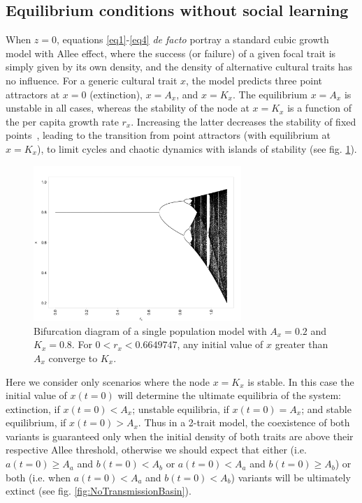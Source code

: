 \documentclass[preprint,authoryear]{elsarticle}
\begin{document}
\subsection{Equilibrium conditions without social learning}

When $z=0$, equations \ref{eq1}-\ref{eq4} \emph{de facto} portray a standard cubic growth model with Allee effect, where the success (or failure) of a given focal trait is simply given by its own density, and the density of alternative cultural traits has no influence. For a generic cultural trait $x$, the model predicts three point attractors at $x=0$ (extinction), $x=A_x$, and $x=K_x$. The equilibrium $x=A_x$ is unstable in all cases, whereas the stability of the node at $x=K_x$ is a function of the per capita growth rate $r_x$. Increasing the latter decreases the stability of fixed points~\citep{scheuring_1999}, leading to the transition from point attractors (with equilibrium at $x=K_x$), to limit cycles and chaotic dynamics with islands of stability (see fig. \ref{fig:bifurcationDiagram}). %

\begin{figure}[h!]
  \centering
      \includegraphics[width=0.7\textwidth]{./figures/figure1.jpg}
  \caption{Bifurcation diagram of a single population model with $A_x=0.2$ and $K_x=0.8$. For $0<r_x<0.6649747$, any initial value of $x$ greater than $A_x$ converge to $K_x$.}
    \label{fig:bifurcationDiagram}
\end{figure}

Here we consider only scenarios where the node $x=K_x$ is stable. In this case the initial value of $x(t=0)$ will determine the ultimate equilibria of the system: extinction, if $x(t=0)<A_x$; unstable equilibria, if $x(t=0)=A_x$; and stable equilibrium, if $x(t=0)>A_x$. Thus in a 2-trait model, the coexistence of both variants is guaranteed only when the initial density of both traits are above their respective Allee threshold, otherwise we should expect that either (i.e. $a(t=0) \geq A_a$ and $b(t=0)<A_b$ or $a(t=0)<A_a$ and $b(t=0) \geq A_b$) or both (i.e. when $a(t=0)<A_a$ and $b(t=0)<A_b$) variants will be ultimately extinct (see fig. \ref{fig:NoTransmissionBasin}). 
\end{document}
